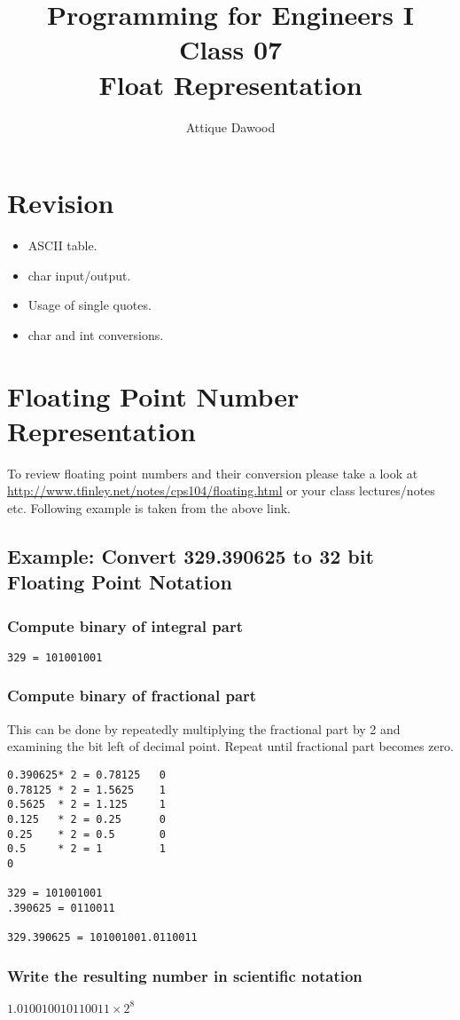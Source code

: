 \documentclass[12pt,a4paper]{article}
\title{\vspace{-2cm}Programming for Engineers I\\Class 07\\Float Representation}
\author{Attique Dawood}
\begin{document}
\maketitle
\section{Revision}
\begin{itemize}
\item ASCII table.
\item char input/output.
\item Usage of single quotes.
\item char and int conversions.
\end{itemize}
\section{Floating Point Number Representation}
To review floating point numbers and their conversion please take a look at \url{http://www.tfinley.net/notes/cps104/floating.html} or your class lectures/notes etc. Following example is taken from the above link.
\subsection{Example: Convert 329.390625 to 32 bit Floating Point Notation}
\subsubsection{Compute binary of integral part}
\verb|329 = 101001001|
\subsubsection{Compute binary of fractional part}
This can be done by repeatedly multiplying the fractional part by 2 and examining the bit left of decimal point. Repeat until fractional part becomes zero.
\begin{verbatim}
0.390625* 2 = 0.78125   0
0.78125 * 2 = 1.5625    1
0.5625  * 2 = 1.125     1
0.125   * 2 = 0.25      0
0.25    * 2 = 0.5       0
0.5     * 2 = 1         1
0

329 = 101001001
.390625 = 0110011

329.390625 = 101001001.0110011
\end{verbatim}
\subsubsection{Write the resulting number in scientific notation}
$1.010010010110011 \times 2^8$
\end{document}
